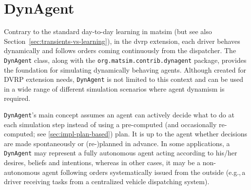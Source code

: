 \section{DynAgent}
\label{sec:dynAgent}
Contrary to the standard day-to-day learning in \gls{matsim} (but see also Section~\ref{sec:transients-vs-learning}), in the \gls{dvrp} extension, each driver behaves dynamically and follows orders coming continuously from the dispatcher. The \lstinline$DynAgent$ class, along with the \lstinline$org.matsim.contrib.dynagent$ package, provides the foundation for simulating dynamically behaving agents. Although created for DVRP extension needs, \lstinline$DynAgent$ is not limited to this context and can be used in a wide range of different simulation scenarios where agent dynamism is required.

\lstinline$DynAgent$'s main concept assumes an agent can actively decide what to do at each simulation step instead of using a pre-computed (and occasionally re-computed; see \ref{sec:impl-plan-based}) plan. It is up to the agent whether decisions are made spontaneously or (re-)planned in advance. In some applications, a \lstinline$DynAgent$ may represent a fully autonomous agent acting according to his/her desires, beliefs and intentions, whereas in other cases, it may be a non-autonomous agent following orders systematically issued from the outside (e.g.,\,a driver receiving tasks from a centralized vehicle dispatching system).


